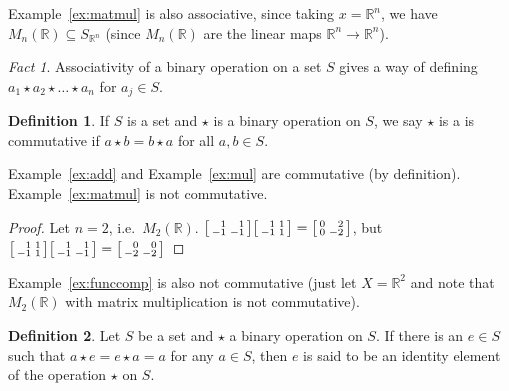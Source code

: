 \documentclass[12pt,letterpaper,DIV=11,final]{scrartcl}
\theoremstyle{plain}
\theoremstyle{definition}
\newtheorem{definition}{Definition}[section]
\theoremstyle{remark}
\newtheorem*{fact}{Fact}
\begin{document}
Example~\ref{ex:matmul} is also associative, since taking $x = \mathbb{R}^n$, we have $M_n(\mathbb{R}) \subseteq S_{\mathbb{R}^n}$ (since $M_n(\mathbb{R})$ are the linear maps $\mathbb{R}^n \to \mathbb{R}^n$).

\begin{fact}
  Associativity of a binary operation on a set $S$ gives a way of defining $a_1 \star a_2 \star \dots \star a_n$ for $a_j \in S$.
\end{fact}

\begin{definition}
  If $S$ is a set and $\star$ is a binary operation on $S$, we say $\star$ is a is commutative if $a \star b = b \star a$ for all $a, b \in S$.
\end{definition}

Example~\ref{ex:add} and Example~\ref{ex:mul} are commutative (by definition).
Example~\ref{ex:matmul} is not commutative.
\begin{proof}
  Let $n = 2$, i.e.\ $M_2(\mathbb{R})$.
  $\begin{bsmallmatrix*}[r]1 & 1 \\ -1 & -1\end{bsmallmatrix*}\begin{bsmallmatrix*}[r]1 & 1 \\ -1 & 1\end{bsmallmatrix*} = \begin{bsmallmatrix*}[r]0 & 2 \\ 0 & -2\end{bsmallmatrix*}$,
  but $\begin{bsmallmatrix*}[r]1 & 1 \\ -1 & 1\end{bsmallmatrix*}\begin{bsmallmatrix*}[r]1 & 1 \\ -1 & -1\end{bsmallmatrix*} = \begin{bsmallmatrix*}[r]0 & 0 \\ -2 & -2\end{bsmallmatrix*}$
\end{proof}
Example~\ref{ex:funccomp} is also not commutative (just let $X = \mathbb{R}^2$ and note that $M_2(\mathbb{R})$ with matrix multiplication is not commutative).

\begin{definition}
  Let $S$ be a set and $\star$ a binary operation on $S$.
  If there is an $e \in S$ such that $a \star e = e \star a = a$ for any $a \in S$, then $e$ is said to be an identity element of the operation $\star$ on $S$.
\end{definition}
\end{document}

